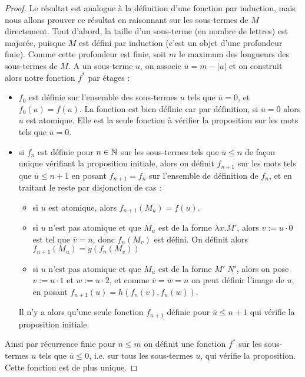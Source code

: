 \begin{proof}
    Le résultat est analogue à la définition d'une fonction par induction, mais nous allons prouver ce résultat en raisonnant sur les sous-termes de $M$ directement. Tout d'abord, la taille d'un sous-terme (en nombre de lettres) est majorée, puisque $M$ est défini par induction (c'est un objet d'une profondeur finie). Comme cette profondeur est finie, soit $m$ le maximum des longueurs des sous-termes de $M$. A un sous-terme $u$, on associe $\overline u = m - |u|$ et on construit alors notre fonction $f^*$ par étages :
    \begin{itemize}[label=$\bullet$]
        \item $f_0$ est définie sur l'ensemble des sous-termes $u$ tels que $\overline u = 0$, et $f_0(u) = f(u)$. La fonction est bien définie car par définition, si $\overline u = 0$ alors $u$ est atomique. Elle est la seule fonction à vérifier la proposition sur les mots tels que $\overline u = 0$.
        \item si $f_n$ est définie pour $n\in\mathbb{N}$ sur les sous-termes tels que $\overline u \leq n$ de façon unique vérifiant la proposition initiale, alors on définit $f_{n+1}$ sur les mots tels que $\overline u \leq n+1$ en posant $f_{n+1} = f_n$ sur l'ensemble de définition de $f_n$, et en traitant le reste par disjonction de cas :
        \begin{itemize}
            \item si $u$ est atomique, alors $f_{n+1}(M_u) = f(u)$.
            \item si $u$ n'est pas atomique et que $M_u$ est de la forme $\lambda x.M'$, alors $v := u\cdot 0$ est tel que $\overline v = n$, donc $f_n(M_v)$ est défini. On définit alors $f_{n+1}(M_u) = g(f_n(M_v))$
            \item si $u$ n'est pas atomique et que $M_u$ est de la forme $M'\;N'$, alors on pose $v := u\cdot 1$ et $w:= u\cdot 2$, et comme $\overline v = \overline w = n$ on peut définir l'image de $u$, en posant $f_{n+1}(u) = h(f_n(v),f_n(w))$.
        \end{itemize}
        Il n'y a alors qu'une seule fonction $f_{n+1}$ définie pour $\overline u \leq n+1$ qui vérifie la proposition initiale.
    \end{itemize}

    Ainsi par récurrence finie pour $n \leq m$ on définit une fonction $f^*$ sur les sous-termes $u$ tels que $\overline u \leq 0$, i.e. sur tous les sous-termes $u$, qui vérifie la proposition. Cette fonction est de plus unique.
\end{proof}

